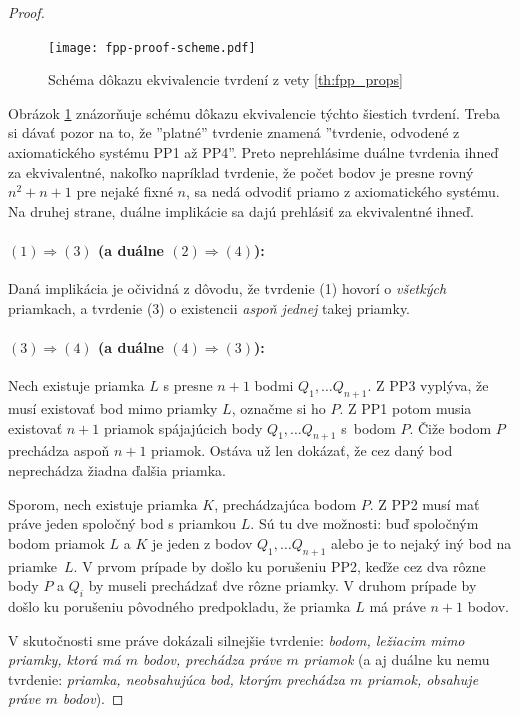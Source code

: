 \begin{proof}
\begin{figure}
    \centering
    \texttt{[image: fpp-proof-scheme.pdf]}
    \caption{Schéma dôkazu ekvivalencie tvrdení z vety \ref{th:fpp_props}}
    \label{fig:fpp_props_scheme}
\end{figure}
Obrázok \ref{fig:fpp_props_scheme} znázorňuje schému dôkazu ekvivalencie týchto šiestich tvrdení.
Treba si dávať pozor na to, že ''platné'' tvrdenie znamená ''tvrdenie, odvodené z axiomatického systému PP1 až PP4''.
Preto neprehlásime duálne tvrdenia ihneď za ekvivalentné, nakoľko napríklad tvrdenie, že počet bodov je presne rovný $n^2 + n + 1$ pre nejaké fixné $n$, sa nedá odvodiť priamo z axiomatického systému.
Na druhej strane, duálne implikácie sa dajú prehlásiť za ekvivalentné ihneď.

\paragraph{$(1) \Longrightarrow (3)$ (a duálne $(2) \Longrightarrow (4)$):} Daná implikácia je očividná z dôvodu, že tvrdenie (1) hovorí o \emph{všetkých} priamkach, a tvrdenie (3) o existencii \emph{aspoň jednej} takej priamky.

\paragraph{$(3) \Longrightarrow (4)$ (a duálne $(4) \Longrightarrow (3)$):} 
Nech existuje priamka $L$ s presne $n+1$ bodmi $Q_1, \ldots Q_{n+1}$. 
Z PP3 vyplýva, že musí existovať bod mimo priamky $L$, označme si ho $P$. 
Z PP1 potom musia existovať $n+1$ priamok spájajúcich body  $Q_1, \ldots Q_{n+1}$ s~bodom $P$. 
Čiže bodom $P$ prechádza aspoň $n+1$ priamok. 
Ostáva už len dokázať, že cez daný bod neprechádza žiadna ďalšia priamka. 

Sporom, nech existuje priamka $K$, prechádzajúca bodom $P$. 
Z PP2 musí mať práve jeden spoločný bod s priamkou $L$. 
Sú tu dve možnosti: buď spoločným bodom priamok $L$ a $K$ je jeden z bodov $Q_1, \ldots Q_{n+1}$ alebo je to nejaký iný bod na priamke~$L$. 
V prvom prípade by došlo ku porušeniu PP2, keďže cez dva rôzne body $P$ a $Q_i$ by museli prechádzať dve rôzne priamky. 
V druhom prípade by došlo ku porušeniu pôvodného predpokladu, že priamka $L$ má práve $n+1$ bodov.

V skutočnosti sme práve dokázali silnejšie tvrdenie: \emph{bodom, ležiacim mimo priamky, ktorá má $m$ bodov, prechádza práve $m$ priamok} (a aj duálne ku nemu tvrdenie: \emph{priamka, neobsahujúca bod, ktorým prechádza $m$ priamok, obsahuje práve $m$ bodov}).


\end{proof}
